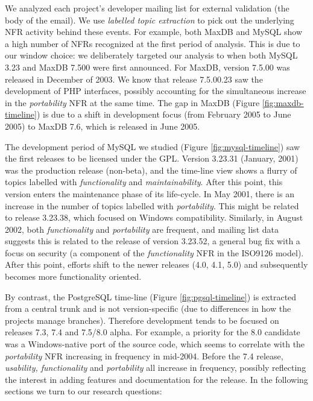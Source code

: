 \documentclass[smallextended]{svjour3}       %
\begin{document}
We analyzed each project's developer mailing list for external validation (the body of the email).
We use \textit{labelled topic extraction} to pick out the underlying NFR activity behind these events. 
For example, both MaxDB and MySQL show a high number of NFRs recognized at the first period of analysis. 
This is due to our window choice: we deliberately targeted our
analysis to when both MySQL 3.23
and MaxDB 7.500 were first announced. For MaxDB, version 7.5.00  was released in December of 2003. 
We know that release 7.5.00.23 saw the development of PHP interfaces, possibly accounting for the simultaneous increase in the \emph{portability}
NFR at the same time.
The gap in MaxDB (Figure \ref{fig:maxdb-timeline}) is due to a shift in development focus (from February 2005 to June 2005) to MaxDB 7.6, which is
released in June 2005.

The development period of MySQL we studied  (Figure \ref{fig:mysql-timeline}) saw the first releases to be licensed under the GPL. 
Version 3.23.31 (January, 2001) was the production release (non-beta), and the time-line view shows a flurry of topics labelled with \emph{functionality} and
\emph{maintainability}. 
After this point, this version enters the maintenance phase of its life-cycle. 
In May 2001, there is an increase in the number of topics labelled with \emph{portability}. 
This might be related to release 3.23.38, which focused on Windows compatibility. 
Similarly, in August 2002, both \emph{functionality} and \emph{portability} are frequent, and mailing list data suggests this is related to the release
of version 3.23.52, a general bug fix with a focus on security (a component of the \emph{functionality} NFR in the ISO9126 model). 
After this point, efforts shift to the newer releases (4.0, 4.1, 5.0) and subsequently becomes more functionality oriented. 

By contrast, the PostgreSQL time-line  (Figure \ref{fig:pgsql-timeline}) is extracted from a central trunk and is not version-specific (due to differences in how the projects manage branches). Therefore development 
tends to be focused on releases 7.3, 7.4 and 7.5/8.0 alpha. For example, a priority for the 8.0 candidate was a Windows-native port of the source code, which seems to 
correlate with the \emph{portability} NFR increasing in frequency in mid-2004. Before the 7.4 release, \emph{usability, functionality} and \emph{portability} all 
increase in frequency, possibly reflecting the interest in adding features and documentation for the release. In the following sections we turn to our research questions:
\end{document}
